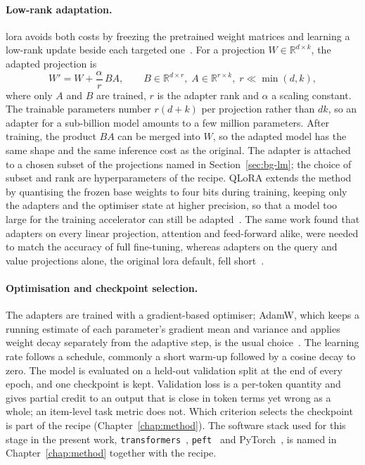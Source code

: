 \paragraph{Low-rank adaptation.} \Gls{lora} avoids both costs by freezing the pretrained weight
matrices and learning a low-rank update beside each targeted one~\cite{lora}. For a projection
$W \in \mathbb{R}^{d \times k}$, the adapted projection is
\begin{equation}
    W' = W + \frac{\alpha}{r}\, B A,
    \qquad B \in \mathbb{R}^{d \times r},\; A \in \mathbb{R}^{r \times k},\; r \ll \min(d, k),
    \label{eq:bg-lora}
\end{equation}
where only $A$ and $B$ are trained, $r$ is the adapter rank and $\alpha$ a scaling constant. The
trainable parameters number $r(d + k)$ per projection rather than $dk$, so an adapter for a
sub-billion model amounts to a few million parameters. After training, the product $BA$ can be
merged into $W$, so the adapted model has the same shape and the same inference cost as the
original. The adapter is attached to a chosen subset of the projections named in
Section~\ref{sec:bg-lm}; the choice of subset and rank are hyperparameters of the recipe.
QLoRA extends the method by quantising the frozen base weights to four bits during training,
keeping only the adapters and the optimiser state at higher precision, so that a model too large
for the training accelerator can still be adapted~\cite{qlora}. The same work found that adapters
on every linear projection, attention and feed-forward alike, were needed to match the accuracy of
full fine-tuning, whereas adapters on the query and value projections alone, the original
\gls{lora} default, fell short~\cite{qlora}.

\paragraph{Optimisation and checkpoint selection.} The adapters are trained with a
gradient-based optimiser; AdamW, which keeps a running estimate of each parameter's gradient mean
and variance and applies weight decay separately from the adaptive step, is the usual
choice~\cite{adamw}. The learning rate follows a schedule, commonly a short warm-up followed by a
cosine decay to zero. The model is evaluated on a held-out validation split at the end of every
epoch, and one checkpoint is kept. Validation loss is a per-token quantity and gives partial
credit to an output that is close in token terms yet wrong as a whole; an item-level task metric
does not. Which criterion selects the checkpoint is part of the recipe
(Chapter~\ref{chap:method}). The software stack
used for this stage in the present work, \texttt{transformers}~\cite{transformers},
\texttt{peft}~\cite{peft} and PyTorch~\cite{pytorch}, is named in Chapter~\ref{chap:method}
together with the recipe.

